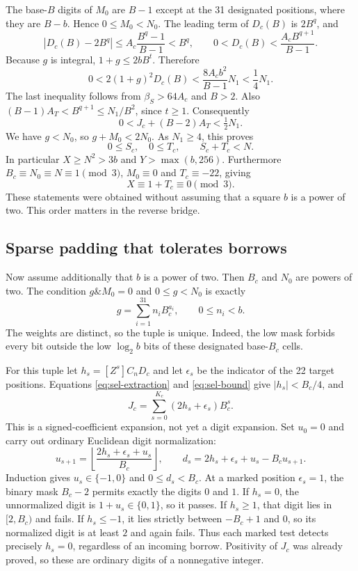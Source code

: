 The base-$B$ digits of $M_0$ are $B-1$ except at the 31 designated
positions, where they are $B-b$. Hence $0\le M_0<N_0$.
The leading term of $D_c(B)$ is $2B^q$, and
\[
 |D_c(B)-2B^q|\le A_c\frac{B^q-1}{B-1}<B^q,
 \qquad 0<D_c(B)<\frac{A_c B^{q+1}}{B-1}.
\]
Because $g$ is integral, $1+g\le2bB^t$. Therefore
\[
 0<2(1+g)^2D_c(B)
 <\frac{8A_cb^2}{B-1}N_1<\frac14N_1.
\]
The last inequality follows from $\beta_S>64A_c$ and $B>2$.
Also $(B-1)A_T<B^{q+1}\le N_1/B^2$, since $t\ge1$.
Consequently
\[
 0<J_c+(B-2)A_T<\tfrac12N_1.
\]
We have $g<N_0$, so $g+M_0<2N_0$. As $N_1\ge4$, this proves
\begin{equation}\label{eq:sel-tight-range}
 0\le S_c,\quad0\le T_c,\qquad S_c+T_c<N.
\end{equation}
In particular $X\ge N^2>3b$ and $Y>\max(b,256)$.
Furthermore $B_c\equiv N_0\equiv N\equiv1\pmod3$,
$M_0\equiv0$ and $T_c\equiv-22$, giving
\[
 X\equiv1+T_c\equiv0\pmod3.
\]
These statements were obtained without assuming that a square $b$ is a
power of two. This order matters in the reverse bridge.

\subsection{Sparse padding that tolerates borrows}

Now assume additionally that $b$ is a power of two. Then $B_c$ and $N_0$
are powers of two. The condition $g\mathbin{\&}M_0=0$ and $0\le g<N_0$
is exactly
\[
 g=\sum_{i=1}^{31}n_iB_c^{a_i},\qquad 0\le n_i<b.
\]
The weights are distinct, so the tuple is unique. Indeed, the low mask
forbids every bit outside the low $\log_2 b$ bits of these designated
base-$B_c$ cells.

For this tuple let $h_s=[Z^s]C_nD_c$ and let $\epsilon_s$ be the indicator
of the 22 target positions. Equations \eqref{eq:sel-extraction} and
\eqref{eq:sel-bound} give $|h_s|<B_c/4$, and
\[
 J_c=\sum_{s=0}^{K_c}(2h_s+\epsilon_s)B_c^s.
\]
This is a signed-coefficient expansion, not yet a digit expansion.
Set $u_0=0$ and carry out ordinary Euclidean digit normalization:
\[
 u_{s+1}=\left\lfloor\frac{2h_s+\epsilon_s+u_s}{B_c}\right\rfloor,
 \qquad d_s=2h_s+\epsilon_s+u_s-B_cu_{s+1}.
\]
Induction gives $u_s\in\{-1,0\}$ and $0\le d_s<B_c$.
At a marked position $\epsilon_s=1$, the binary mask $B_c-2$ permits
exactly the digits $0$ and $1$. If $h_s=0$, the unnormalized digit is
$1+u_s\in\{0,1\}$, so it passes. If $h_s\ge1$, that digit lies in
$[2,B_c)$ and fails. If $h_s\le-1$, it lies strictly between $-B_c+1$
and $0$, so its normalized digit is at least $2$ and again fails.
Thus each marked test detects precisely $h_s=0$, regardless of an
incoming borrow. Positivity of $J_c$ was already proved, so these are
ordinary digits of a nonnegative integer.

